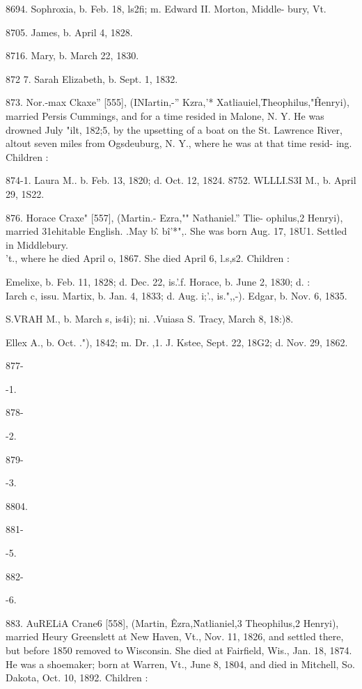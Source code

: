 \documentclass{book}
\begin{document}
8694. Sophroxia, b. Feb. 18, ls2fi; m. Edward II. Morton, Middle- 
bury, Vt. 

8705. James, b. April 4, 1828. 

8716. Mary, b. March 22, 1830. 

872  7. Sarah Elizabeth, b. Sept. 1, 1832. 

873. Nor.-max Ckaxe'' [555], (INIartin,-'' Kzra,'* Xatliauiel,\^ 
Theophilus,"\^ Henryi), married Persis Cummings, and for a time 
resided in Malone, N. Y. He was drowned July "ilt, 182;5, by 
the upsetting of a boat on the St. Lawrence River, altout seven 
miles from Ogsdeuburg, N. Y., where he was at that time resid- 
ing. Children : 

874-1. Laura M.. b. Feb. 13, 1820; d. Oct. 12, 1824. 
8752. WLLLI.S3I M., b. April 29, 1S22. 

876. Horace Craxe" [557], (Martin.- Ezra,"" Nathaniel.'' Tlie- 
ophilus,2 Henryi), married 31ehitable English. .May b\^. b\^i'*",. 
She was born Aug. 17, 18U1. Settled in Middlebury. \\'t., where 
he died April o, 1867. She died April 6, l.s,s2. Children : 

Emelixe, b. Feb. 11, 1828; d. Dec. 22, is.'.f. 
Horace, b. June 2, 1830; d. :\\Iarch c, issu. 
Martix, b. Jan. 4, 1833; d. Aug. i;'., is.",,-). 
Edgar, b. Nov. 6, 1835. 

S.VRAH M., b. March s, is4i); ni. .Vuiasa S. Tracy, March 8, 
18:)8. 

Ellex A., b. Oct. ."), 1842; m. Dr. ,1. J. Kstee, Sept. 22, 18G2; 
d. Nov. 29, 1862. 



877- 


-1. 


878- 


-2. 


879- 


-3. 


8804. 


881- 


-5. 


882- 


-6. 




883. AuRELiA Crane6 [558], (Martin, \^ Ezra,\^ Natlianiel,3 
Theophilus,2 Henryi), married Heury Greenslett at New Haven, 
Vt., Nov. 11, 1826, and settled there, but before 1850 removed 
to Wisconsin. She died at Fairfield, Wis., Jan. 18, 1874. He 
was a shoemaker; born at Warren, Vt., June 8, 1804, and died 
in Mitchell, So. Dakota, Oct. 10, 1892. Children : 
\end{document}

